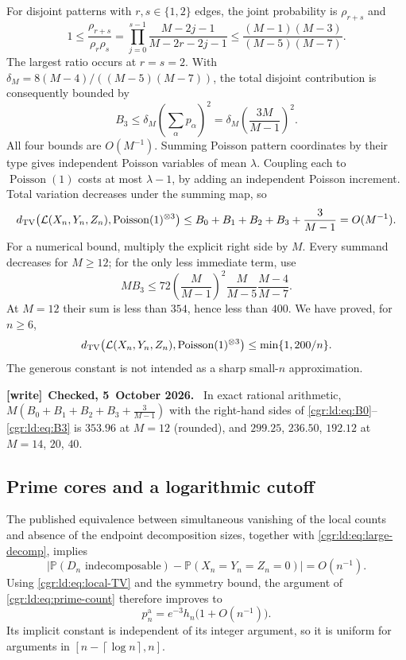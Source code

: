 \documentclass[11pt,letterpaper]{article}
\numberwithin{equation}{section}
\theoremstyle{definition}\newtheorem{definition}[theorem]{Definition}
\theoremstyle{remark}\newtheorem{remark}[theorem]{Remark}
\newcommand{\PP}{\mathbb P}
\newcommand{\ceil}[1]{\left\lceil #1\right\rceil}
\DeclareMathOperator{\Poi}{Poisson}
\newenvironment{writenote}[1][]{\par\smallskip\begingroup\small
 \noindent\textbf{[write]}\if\relax\detokenize{#1}\relax\else~\textbf{#1.}\fi\ }%
 {\par\endgroup\smallskip}
\begin{document}
For disjoint patterns with $r,s\in\{1,2\}$ edges, the joint
probability is $\rho_{r+s}$ and
\[
 1\le\frac{\rho_{r+s}}{\rho_r\rho_s}
 =\prod_{j=0}^{s-1}\frac{M-2j-1}{M-2r-2j-1}
 \le\frac{(M-1)(M-3)}{(M-5)(M-7)}.
\]
The largest ratio occurs at $r=s=2$. With
$\delta_M=8(M-4)/((M-5)(M-7))$, the total disjoint
contribution is consequently bounded by
\begin{equation}\label{cgr:ld:eq:B3}
 B_3\le\delta_M\left(\sum_\alpha p_\alpha\right)^2
 =\delta_M\left(\frac{3M}{M-1}\right)^2.
\end{equation}
All four bounds are $O(M^{-1})$. Summing Poisson pattern
coordinates by their type gives independent Poisson variables
of mean $\lambda$. Coupling each to $\Poi(1)$ costs at most
$\lambda-1$, by adding an independent Poisson increment.
Total variation decreases under the summing map, so
\begin{equation}\label{cgr:ld:eq:local-TV}
 d_{\rm TV}\bigl(\mathcal L(X_n,Y_n,Z_n),\Poi(1)^{\otimes3}\bigr)
 \le B_0+B_1+B_2+B_3+\frac3{M-1}=O(M^{-1}).
\end{equation}
For a numerical bound, multiply the explicit right side by
$M$. Every summand decreases for $M\ge12$; for the only
less immediate term, use
\[
 MB_3\le72\left(\frac M{M-1}\right)^2
              \frac M{M-5}\frac{M-4}{M-7}.
\]
At $M=12$ their sum is less than $354$, hence less than $400$.
We have proved, for $n\ge6$,
\begin{equation}\label{cgr:ld:eq:explicit-TV}
 d_{\rm TV}\bigl(\mathcal L(X_n,Y_n,Z_n),\Poi(1)^{\otimes3}\bigr)
 \le\min\{1,200/n\}.
\end{equation}
The generous constant is not intended as a sharp small-$n$
approximation.
\begin{writenote}[Checked, 5~October 2026]
In exact rational arithmetic, $M(B_0+B_1+B_2+B_3+\frac3{M-1})$ with the right-hand sides of \eqref{cgr:ld:eq:B0}--\eqref{cgr:ld:eq:B3} is $353.96$ at $M=12$ (rounded), and $299.25$, $236.50$, $192.12$ at $M=14$, $20$, $40$.
\end{writenote}

\subsection*{Prime cores and a logarithmic cutoff}
The published equivalence between simultaneous vanishing of the
local counts and absence of the endpoint decomposition sizes,
together with \eqref{cgr:ld:eq:large-decomp}, implies
\[
 \left|\PP(D_n\text{ indecomposable})-
       \PP(X_n=Y_n=Z_n=0)\right|=O(n^{-1}).
\]
Using \eqref{cgr:ld:eq:local-TV} and the symmetry bound, the argument
of \eqref{cgr:ld:eq:prime-count} therefore improves to
\begin{equation}\label{cgr:ld:eq:quant-prime}
 p_n^{\mathrm a}=e^{-3}h_n\bigl(1+O(n^{-1})\bigr).
\end{equation}
Its implicit constant is independent of its integer argument,
so it is uniform for arguments in
$[n-\ceil{\log n},n]$.
\end{document}
